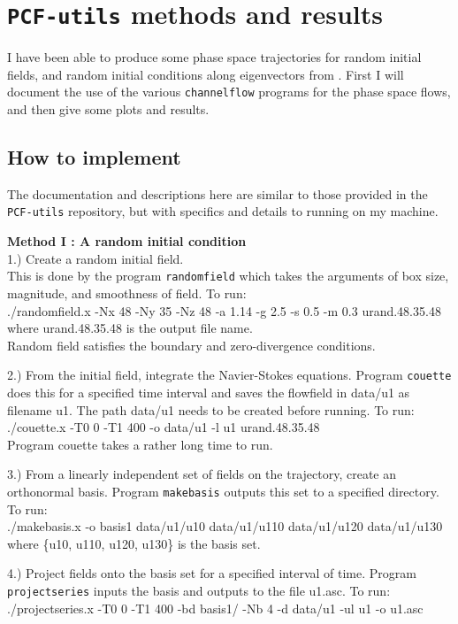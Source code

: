 \documentclass[pre,twocolumn,groupedaddress]{revtex4}
\begin{document}
{\section{{\tt PCF-utils} methods and results}

 I have been able to produce some phase space
trajectories for random initial fields, and random initial
conditions along eigenvectors from \eqva. First I will document the
use of the various {\tt channelflow} programs for the phase space
flows, and then give some plots and results.

\subsection{How to implement}
The documentation and descriptions here are similar to those
provided in the {\tt PCF-utils} repository, but with specifics and
details to running on my machine.

\textbf{Method I : A random initial condition} \\
 1.) Create a random initial field. \\
This is done by the program {\tt randomfield} which takes the arguments
of box size, magnitude, and smoothness of field. To run: \\
./randomfield.x -Nx 48 -Ny 35 -Nz 48 -a 1.14 -g 2.5 -s 0.5 -m 0.3
urand.48.35.48 \\
where urand.48.35.48 is the output file name.\\
Random field satisfies the boundary and zero-divergence conditions.

 2.) From the initial field, integrate the Navier-Stokes equations. Program
{\tt couette} does
this for a specified time interval and saves the flowfield in
data/u1 as filename u1. The path data/u1 needs to be created before
running.
 To run: \\
./couette.x -T0 0 -T1 400 -o data/u1 -l u1 urand.48.35.48 \\
Program couette takes a rather long time to run.

3.) From a linearly independent set of fields on the trajectory,
create an orthonormal basis. Program {\tt makebasis} outputs this
set to
a specified directory. To run: \\
./makebasis.x -o basis1 data/u1/u10 data/u1/u110 data/u1/u120 data/u1/u130 \\
where \{u10, u110, u120, u130\} is the basis set.

4.) Project fields onto the basis set for a specified interval of
time. Program {\tt projectseries} inputs the basis and outputs to the
file u1.asc. To run: \\
./projectseries.x -T0 0 -T1 400 -bd basis1/ -Nb 4 -d data/u1 -ul u1 -o u1.asc

}
\end{document}
